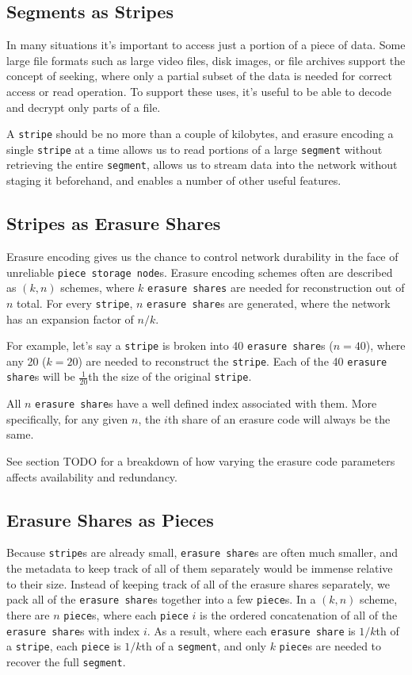 \documentclass[11pt,fleqn,openany]{book}
\newcommand{\x}[1]{{\tt #1}} \newcommand{\code}[1]{{\tt #1}}
\newcommand{\todo}[1]{{\color{red} TODO #1 }}
\begin{document}
\subsection{Segments as Stripes}

In many situations it's important to access just a portion of a piece of
data. Some large file formats such as large video files, disk images, or file
archives support the concept of seeking,
where only a partial subset of the data is needed for correct access or
read operation. To support these uses,
it's useful to be able to decode and decrypt only parts of a file.

A \x{stripe} should be no more than a couple of kilobytes, and erasure encoding
a single \x{stripe} at a time allows us to read portions of a large \x{segment}
without retrieving the entire \x{segment}, allows us to stream data into the
network without staging it beforehand, and enables a number of other useful
features.

\subsection{Stripes as Erasure Shares}

Erasure encoding gives us the chance to control network durability in the face
of unreliable \x{piece storage node}s. Erasure encoding schemes often are
described as $(k, n)$ schemes, where $k$ \x{erasure shares} are needed for
reconstruction out of $n$ total. For every \x{stripe}, $n$ \x{erasure share}s
are generated, where the network has an expansion factor of $n/k$.

For example, let's say a \x{stripe} is broken into 40 \x{erasure share}s
($n=40$), where any 20 ($k=20$) are needed to reconstruct the \x{stripe}. Each
of the 40 \x{erasure share}s will be $\frac{1}{20}$th the size of the original
\x{stripe}.

All $n$ \x{erasure share}s have a well defined index associated
with them. More specifically, for any given $n$, the $i$th share of an erasure
code will always be the same.

See section \todo{} for a breakdown of how varying the erasure code parameters
affects availability and redundancy.

\subsection{Erasure Shares as Pieces}

Because \x{stripe}s are already small, \x{erasure share}s are often much
smaller, and the metadata to keep track of all of them separately would be
immense relative to their size. Instead of keeping track of all of the
erasure shares separately, we pack all of the \x{erasure share}s together into
a few \x{piece}s.
In a $(k, n)$ scheme, there are $n$ \x{piece}s, where each
\x{piece} $i$ is the ordered concatenation of all of the \x{erasure share}s with
index $i$. As a result, where each \x{erasure share} is $1/k$th of a
\x{stripe}, each \x{piece} is $1/k$th of a \x{segment}, and only $k$
\x{piece}s are needed to recover the full \x{segment}.
\end{document}
